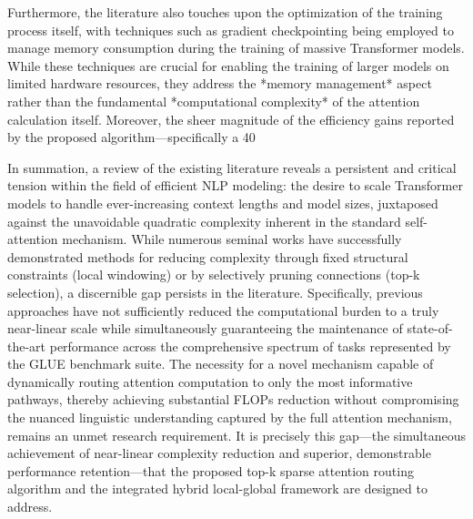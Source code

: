 \documentclass[12pt]{article}
\begin{document}
Furthermore, the literature also touches upon the optimization of the training process itself, with techniques such as gradient checkpointing being employed to manage memory consumption during the training of massive Transformer models. While these techniques are crucial for enabling the training of larger models on limited hardware resources, they address the *memory management* aspect rather than the fundamental *computational complexity* of the attention calculation itself. Moreover, the sheer magnitude of the efficiency gains reported by the proposed algorithm—specifically a 40%

In summation, a review of the existing literature reveals a persistent and critical tension within the field of efficient NLP modeling: the desire to scale Transformer models to handle ever-increasing context lengths and model sizes, juxtaposed against the unavoidable quadratic complexity inherent in the standard self-attention mechanism. While numerous seminal works have successfully demonstrated methods for reducing complexity through fixed structural constraints (local windowing) or by selectively pruning connections (top-k selection), a discernible gap persists in the literature. Specifically, previous approaches have not sufficiently reduced the computational burden to a truly near-linear scale while simultaneously guaranteeing the maintenance of state-of-the-art performance across the comprehensive spectrum of tasks represented by the GLUE benchmark suite. The necessity for a novel mechanism capable of dynamically routing attention computation to only the most informative pathways, thereby achieving substantial FLOPs reduction without compromising the nuanced linguistic understanding captured by the full attention mechanism, remains an unmet research requirement. It is precisely this gap—the simultaneous achievement of near-linear complexity reduction and superior, demonstrable performance retention—that the proposed top-k sparse attention routing algorithm and the integrated hybrid local-global framework are designed to address.
\end{document}
